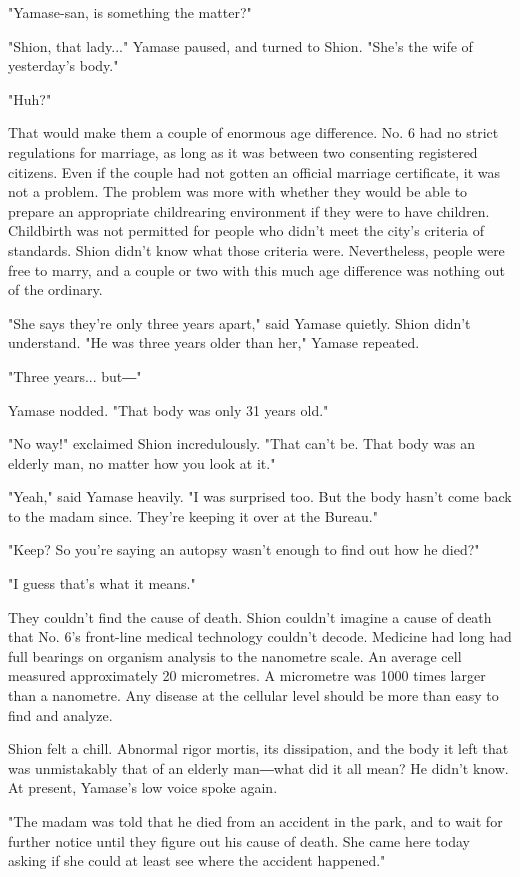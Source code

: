 "Yamase-san, is something the matter?"

"Shion, that lady..." Yamase paused, and turned to Shion. "She's the
wife of yesterday's body."

"Huh?"

That would make them a couple of enormous age difference. No. 6 had no
strict regulations for marriage, as long as it was between two
consenting registered citizens. Even if the couple had not gotten an
official marriage certificate, it was not a problem. The problem was
more with whether they would be able to prepare an appropriate
childrearing environment if they were to have children. Childbirth was
not permitted for people who didn't meet the city's criteria of
standards. Shion didn't know what those criteria were. Nevertheless,
people were free to marry, and a couple or two with this much age
difference was nothing out of the ordinary.

"She says they're only three years apart," said Yamase quietly. Shion
didn't understand. "He was three years older than her," Yamase repeated.

"Three years... but―"

Yamase nodded. "That body was only 31 years old."

"No way!" exclaimed Shion incredulously. "That can't be. That body was
an elderly man, no matter how you look at it."

"Yeah," said Yamase heavily. "I was surprised too. But the body hasn't
come back to the madam since. They're keeping it over at the Bureau."

"Keep? So you're saying an autopsy wasn't enough to find out how he
died?"

"I guess that's what it means."

They couldn't find the cause of death. Shion couldn't imagine a cause of
death that No. 6's front-line medical technology couldn't decode.
Medicine had long had full bearings on organism analysis to the
nanometre scale. An average cell measured approximately 20 micrometres.
A micrometre was 1000 times larger than a nanometre. Any disease at the
cellular level should be more than easy to find and analyze.

Shion felt a chill. Abnormal rigor mortis, its dissipation, and the body
it left that was unmistakably that of an elderly man―what did it all
mean? He didn't know. At present, Yamase's low voice spoke again.

"The madam was told that he died from an accident in the park, and to
wait for further notice until they figure out his cause of death. She
came here today asking if she could at least see where the accident
happened."

